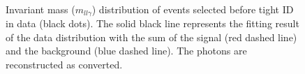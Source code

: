 \begin{figure}[htbp]
    \centering
	 \\
	\begin{tcolorbox}[colback=black!5!white,colframe=white!75!black]
    \caption{Invariant mass ($m_{ll\gamma}$) distribution of events selected before tight ID in data (black dots). The solid black line represents the fitting result of the data distribution with the sum of the signal (red dashed line) and the background (blue dashed line). The photons are reconstructed as converted.}
    \label{Eff:TemplateFit:C:Before}
    \end{tcolorbox}
    
\end{figure}

